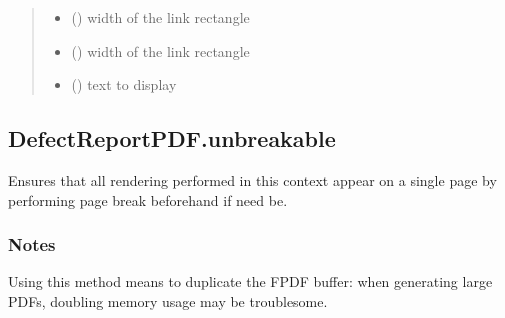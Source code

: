 \documentclass[letterpaper,10pt,english]{sphinxmanual}
\begin{document}
\begin{fulllineitems}
\begin{fulllineitems}
\begin{quote}
\begin{description}
\begin{itemize}
\item {} 
\sphinxAtStartPar
{} () \textendash{} width of the link rectangle

\item {} 
\sphinxAtStartPar
{} () \textendash{} width of the link rectangle

\item {} 
\sphinxAtStartPar
{} () \textendash{} text to display

\end{itemize}

\end{description}\end{quote}

\end{fulllineitems}



\subsection{DefectReportPDF.unbreakable}
\label{\detokenize{generated/quality_assessment.quality_pdf_report.DefectReportPDF.unbreakable:defectreportpdf-unbreakable}}\label{\detokenize{generated/quality_assessment.quality_pdf_report.DefectReportPDF.unbreakable::doc}}

\begin{fulllineitems}
\label{\detokenize{generated/quality_assessment.quality_pdf_report.DefectReportPDF.unbreakable:quality_assessment.quality_pdf_report.DefectReportPDF.unbreakable}}
\sphinxAtStartPar
Ensures that all rendering performed in this context appear on a single page
by performing page break beforehand if need be.
\subsubsection*{Notes}

\sphinxAtStartPar
Using this method means to duplicate the FPDF  buffer:
when generating large PDFs, doubling memory usage may be troublesome.


\end{fulllineitems}
\end{fulllineitems}
\end{document}
